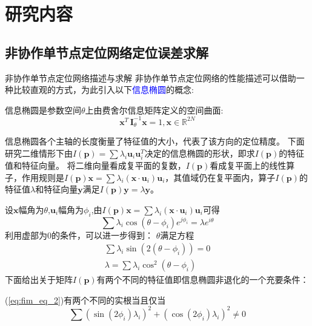 \section{研究内容}
\subsection{非协作单节点定位网络定位误差求解}\label{subsection:circle_general}
{非协作单节点定位网络描述与求解}
非协作单节点定位网络的性能描述可以借助一种比较直观的方式，为此引入以下\textcolor{blue}{信息椭圆}的概念:
\begin{definition}
信息椭圆是参数空间$\theta$上由费舍尔信息矩阵定义的空间曲面:
\begin{equation}\label{eq:ie}
\bm{x}^T\,\bm{I}_{\theta}^{-1}\bm{x}=1,\bm{x}\in \mathbb{R}^{2N}
\end{equation}
\end{definition}
信息椭圆各个主轴的长度衡量了特征值的大小，代表了该方向的定位精度。
下面研究二维情形下由$I(\bm{p})=\sum \lambda_i \bm{u}_i \bm{u}_i^T$决定的信息椭圆的形状，即求$I(\bm{p})$的特征值和特征向量。
将二维向量看成复平面的复数，$I(\bm{p})$看成复平面上的线性算子，作用规则是$I(\bm{p})\bm{x}=\sum \lambda_i (\bm{x}\cdot\bm{u}_i)\bm{u}_i$，其值域仍在复平面内，算子$I(\bm{p})$的特征值$\lambda$和特征向量$\bm{y}$满足$I(\bm{p})\bm{y}=\lambda \bm{y}$。


设$\bm{x}$幅角为$\theta$,$\bm{u}_i$幅角为$\phi_i$,由$I(\bm{p})\bm{x}=\sum \lambda_i (\bm{x}\cdot\bm{u}_i)\bm{u}_i$可得
\begin{equation}
\sum \lambda_i \cos(\theta-\phi_i)e^{j\phi_i}=\lambda e^{i\theta}
\end{equation}
利用虚部为0的条件，可以进一步得到：
$\theta$满足方程
\begin{eqnarray}\label{eq:fim_eq_1}
\sum \lambda_i \sin(2(\theta-\phi_i))=0\\
\lambda=\sum \lambda_i \cos^2(\theta-\phi_i)\label{eq:fim_eq_2}
\end{eqnarray}
下面给出关于矩阵$I(\bm{p})$有两个不同的特征值即信息椭圆非退化的一个充要条件：
\begin{theorem}
(\ref{eq:fim_eq_2})有两个不同的实根当且仅当\[
\sum (\sin(2\phi_i)\lambda_i)^2+(\cos(2\phi_i)\lambda_i)^2 \neq 0\]
\end{theorem}

